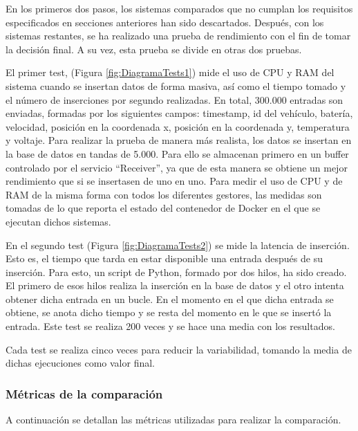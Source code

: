 En los primeros dos pasos, los sistemas comparados que no cumplan los requisitos especificados en secciones anteriores
han sido descartados. Después, con los sistemas restantes, se ha realizado una prueba de rendimiento con el fin de
tomar la decisión final. A su vez, esta prueba se divide en otras dos pruebas.


El primer test, (Figura \ref{fig:DiagramaTests1}) mide el uso de CPU y RAM del sistema cuando se insertan datos de forma
masiva, así como el tiempo tomado y el número de inserciones por segundo realizadas. En total, 300.000 entradas son enviadas,
formadas por los siguientes campos: timestamp, id del vehículo, batería, velocidad, posición en la coordenada x, posición
en la coordenada y, temperatura y voltaje. Para realizar la prueba de manera más realista, los datos se insertan en la
base de datos en tandas de 5.000. Para ello se almacenan primero en un buffer controlado por el servicio ``Receiver'', ya
que de esta manera se obtiene un mejor rendimiento que si se insertasen de uno en uno. Para medir el uso de CPU y de RAM
de la misma forma con todos los diferentes gestores, las medidas son tomadas de lo que reporta el estado del contenedor
de Docker en el que se ejecutan dichos sistemas.

En el segundo test (Figura \ref*{fig:DiagramaTests2}) se mide la latencia de inserción. Esto es, el tiempo que tarda
en estar disponible una entrada después de su inserción. Para esto, un script de Python, formado por dos hilos, ha sido creado.
El primero de esos hilos realiza la inserción en la base de datos y el otro intenta obtener dicha entrada en un bucle.
En el momento en el que dicha entrada se obtiene, se anota dicho tiempo y se resta del momento en le que se insertó
la entrada. Este test se realiza 200 veces y se hace una media con los resultados.

Cada test se realiza cinco veces para reducir la variabilidad, tomando la media de dichas ejecuciones como valor final.

\subsubsection*{Métricas de la comparación} 
A continuación se detallan las métricas utilizadas para realizar la comparación.


